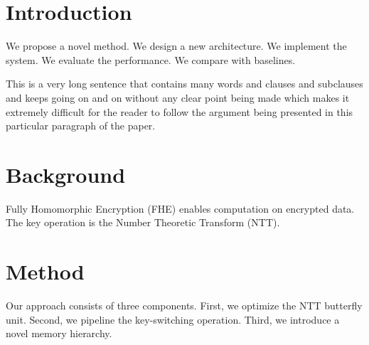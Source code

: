 \documentclass{article}
\begin{document}
\section{Introduction}
\label{sec:intro}

We propose a novel method. We design a new architecture. We implement the system.
We evaluate the performance. We compare with baselines.

This is a very long sentence that contains many words and clauses and subclauses and keeps going on and on without any clear point being made which makes it extremely difficult for the reader to follow the argument being presented in this particular paragraph of the paper.

\section{Background}
\label{sec:bg}

Fully Homomorphic Encryption (FHE) enables computation on encrypted data.
The key operation is the Number Theoretic Transform (NTT).

\section{Method}
\label{sec:method}

Our approach consists of three components.
First, we optimize the NTT butterfly unit.
Second, we pipeline the key-switching operation.
Third, we introduce a novel memory hierarchy.
\end{document}

